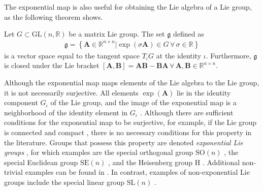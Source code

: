 The exponential map is also useful for obtaining the Lie algebra of a Lie group, as the following theorem shows.
\begin{theorem}
    Let $G\subset\text{GL}(n, \mathbb{R})$ be a matrix Lie group. The set $\mathfrak{g}$ defined as
    \begin{align}
        \mathfrak{g} = \left\{\mathbf{A}\in\mathbb{R}^{n\times n} | \exp(\sigma\mathbf{A})\in G\,\forall\,\sigma\in\mathbb{R}\right\}
    \end{align}
    is a vector space equal to the tangent space $T_\iota G$ at the identity $\iota$. Furthermore, $\mathfrak{g}$ is closed under the Lie bracket $[\mathbf{A}, \mathbf{B}] = \mathbf{A}\mathbf{B} - \mathbf{B}\mathbf{A}\,\forall\,\mathbf{A},\mathbf{B}\in\mathbb{R}^{n\times n}$.\hfill\qedsymbol
\end{theorem}

Although the exponential map maps elements of the Lie algebra to the Lie group, it is not necessarily surjective. All elements $\exp(\mathbf{A})$ lie in the identity component $G_\iota$ of the Lie group, and the image of the exponential map is a neighborhood of the identity element in $G_\iota$ \citep[p. 56]{Hall2015}. Although there are sufficient conditions for the exponential map to be surjective, for example, if the Lie group is connected and compact \citep[p. 316]{Hall2015}, there is no necessary conditions for this property in the literature. Groups that possess this property are denoted \emph{exponential Lie groups} \citep{djokovic1995exponential}, for which examples are the special orthogonal group $\text{SO}(n)$ \citep[p. 28]{Gallier2020}, the special Euclidean  group $\text{SE}(n)$ \citep[p. 42]{Gallier2020}, and the Heisenberg group $\text{H}$ \citep[p. 75]{Hall2015}. Additional non-trivial examples can be found in \citet{djokovic1995exponential}. In contrast, examples of non-exponential Lie groups include the special linear group $\text{SL}(n)$ \citep[p. 28]{Gallier2020}.

